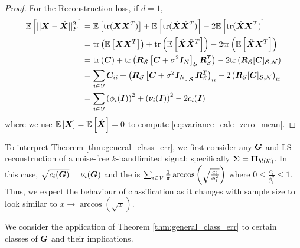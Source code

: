 \begin{proof}
    For the Reconstruction loss, if $d=1$,
    \begin{align}
     \expect{||\matr{X} - \hat{\matr{X}}||^{2}_{F}} &=  \expect{\text{tr}(\matr{X}\matr{X}^{T})} + \expect{\text{tr}(\hat{\matr{X}}\hat{\matr{X}}^{T})} - 2\expect{\text{tr}(\hat{\matr{X}}\matr{X}^{T})}  \\
     &= \text{tr}\left(\expect{\matr{X}\matr{X}^{T}}\right) + \text{tr}\left(\expect{\hat{\matr{X}}\hat{\matr{X}}^{T}}\right) - 2 \text{tr}\left(\expect{\hat{\matr{X}}\matr{X}^{T}} \right) \\
     &= \text{tr}\left(\matr{C}\right) + \text{tr}\left( \matr{R}_{\set{S}}\msubgen[\set{S}]{\matr{C} + \sigma^{2}\matr{I}_{N}} \matr{R}_{\set{S}}^{T} \right) - 2 \text{tr}\left(\matr{R}_{\set{S}}\matrsub[S,N]{C}\right) \label{eq:variance_calc_zero_mean}\\
     &= \sum_{i \in \set{V}} \matr{C}_{ii} + \left( \matr{R}_{\set{S}}\msubgen[\set{S}]{\matr{C} + \sigma^{2}\matr{I}_{N}} \matr{R}_{\set{S}}^{T} \right)_{ii} - 2 \left(\matr{R}_{\set{S}}\matrsub[S,N]{C}\right)_{ii} \\
     &=  \sum_{i \in \set{V}} \left(\phi_{i}(\matr{I})\right)^{2} + \left(\nu_{i}(\matr{I})\right)^{2} - 2c_{i}(\matr{I})
    \end{align}
   where we use $\expect{\matr{X}} = \expect{\hat{\matr{X}}} = 0$ to compute \eqref{eq:variance_calc_zero_mean}. 
\end{proof}


 To interpret Theorem \ref{thm:general_class_err}, we first consider any $\bm{G}$ and LS reconstruction of a noise-free $k$-bandlimited signal; specifically $\matr{\Sigma} = \projbl$. In this case, $\sqrt{c_{i}(\bm{G})} = \nu_{i}(\bm{G})$ and the {} is $\sum_{i \in \mathcal{V}} \frac{1}{\pi}\arccos{\left(\sqrt{\frac{c_{i}}{\phi_{i}^{2}}}\right)}$ where $0 \leq \frac{c_{i}}{\phi_{i}^{2}} \leq 1$. Thus, we expect the behaviour of classification  as it changes with sample size to look similar to $x \to \arccos{\left(\sqrt{x}\right)}$. 
 
 We consider the application of Theorem \ref{thm:general_class_err} to certain classes of $\bm{G}$ and their implications.

